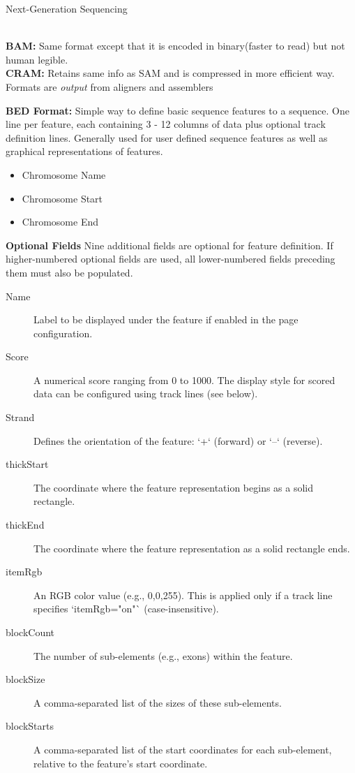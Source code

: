 \documentclass[twocolumn]{article}
\begin{document}
\begin{literaturepaper}{Next-Generation Sequencing \cite{gencore_how_sequencing_works}}
\begin{itemize}
\end{itemize}\\

\textbf{BAM:} Same format except that it is encoded in binary(faster to read) but not human legible.\\

\textbf{CRAM:} Retains same info as SAM and is compressed in more efficient way.\\

Formats are \textit{output} from aligners and assemblers 

\textbf{BED Format:} Simple way to define basic sequence features to a sequence. One line per feature, each containing 3 - 12 columns of data plus optional track definition lines. Generally used for user defined sequence features as well as graphical representations of features.

\begin{itemize}
    \item Chromosome Name
    \item Chromosome Start
    \item Chromosome End 
\end{itemize}

\textbf{Optional Fields}
Nine additional fields are optional for feature definition. If higher-numbered optional fields are used, all lower-numbered fields preceding them must also be populated.

\begin{description}
    \item[Name] Label to be displayed under the feature if enabled in the page configuration.
    \item[Score] A numerical score ranging from 0 to 1000. The display style for scored data can be configured using track lines (see below).
    \item[Strand] Defines the orientation of the feature: `+` (forward) or `–` (reverse).
    \item[thickStart] The coordinate where the feature representation begins as a solid rectangle.
    \item[thickEnd] The coordinate where the feature representation as a solid rectangle ends.
    \item[itemRgb] An RGB color value (e.g., 0,0,255). This is applied only if a track line specifies `itemRgb="on"` (case-insensitive).
    \item[blockCount] The number of sub-elements (e.g., exons) within the feature.
    \item[blockSize] A comma-separated list of the sizes of these sub-elements.
    \item[blockStarts] A comma-separated list of the start coordinates for each sub-element, relative to the feature's start coordinate.
\end{description}


\end{literaturepaper}
\end{document}
